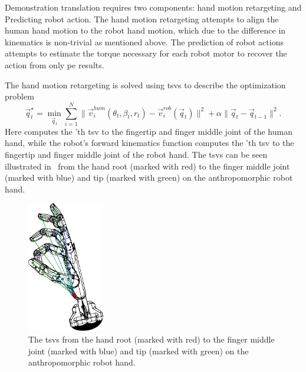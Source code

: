 Demonstration translation requires two components: hand motion retargeting and Predicting robot action. The hand motion retargeting attempts to align the human hand motion to the robot hand motion, which due to the difference in kinematics is non-trivial as mentioned above. The prediction of robot actions attempts to estimate the torque necessary for each robot motor to recover the action from only \gls{pe} results. \medskip

The hand motion retargeting is solved using \gls{tsv}s to describe the optimization problem
%
\begin{equation}
    \vec{q}^\star_t = \min_{\vec{q}_t} \sum^N_{i=1}\| \vec{v}^{hum}_i(\theta_t,\beta_t,r_t)-\vec{v}^{rob}_i(\vec{q}_t)\|^2+\alpha \| \vec{q}_t - \vec{q}_{t-1} \|^2.
\end{equation}
Here  computes the 'th \gls{tsv} to the fingertip and finger middle joint of the human hand, while the robot's forward kinematics function  computes the 'th \gls{tsv} to the fingertip and finger middle joint of the robot hand. The \gls{tsv}s can be seen illustrated in~ from the hand root (marked with red) to the finger middle joint (marked with blue) and tip (marked with green) on the anthropomorphic robot hand.\medskip

\begin{figure}[!h]
	\begin{center}
		\includegraphics[width=0.3\textwidth]{chapters/3-in-hand-manipulation/fig/tsv.pdf}
	\end{center}
	\caption{The \gls{tsv}s from the hand root (marked with red) to the finger middle joint (marked with blue) and tip (marked with green) on the anthropomorphic robot hand.}
	\label{fig:tsv}
\end{figure}

